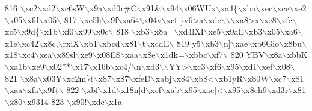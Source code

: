 \begin{DoxyCode}
{{{{{{816 \textcolor{stringliteral}{\(\backslash\)xc2\(\backslash\)xd2\(\backslash\)xc6sW\(\backslash\)x9a\(\backslash\)xd0r#C\(\backslash\)x91&\(\backslash\)x94\(\backslash\)x06WUx\(\backslash\)xa4\{\(\backslash\)xba\(\backslash\)xec\(\backslash\)xce\(\backslash\)xe2\(\backslash\)x05\(\backslash\)xfd\(\backslash\)x05\(\backslash\)}
817 \textcolor{stringliteral}{\(\backslash\)xe5h\(\backslash\)x9f\(\backslash\)xa64\(\backslash\)x04v\(\backslash\)xcf \}v6>a\(\backslash\)xdc\(\backslash\)\(\backslash\)\(\backslash\)xa8>x\(\backslash\)xe8\(\backslash\)xfc\(\backslash\)xc5\(\backslash\)x9d\{\(\backslash\)x1b\(\backslash\)xf0\(\backslash\)x99\(\backslash\)x0c\(\backslash\)}
818 \textcolor{stringliteral}{\(\backslash\)xb3\(\backslash\)x8a=\(\backslash\)xd4lXI\(\backslash\)xe5\(\backslash\)x9aE\(\backslash\)xb3\(\backslash\)x05\(\backslash\)xa6\(\backslash\)x1e\(\backslash\)xc42\(\backslash\)x8c,\(\backslash\)rxiX\(\backslash\)xb1\(\backslash\)xbcd\(\backslash\)x81\(\backslash\)t\(\backslash\)xcdE\(\backslash\)}
819 \textcolor{stringliteral}{y5\(\backslash\)xb3\(\backslash\)n]\(\backslash\)xae\(\backslash\)xb6Gio\(\backslash\)x8bu\(\backslash\)x18\(\backslash\)xc4\(\backslash\)xea\(\backslash\)x89sl\(\backslash\)xe9\(\backslash\)x08ES\(\backslash\)xaa\(\backslash\)x8e\(\backslash\)x1dk=\(\backslash\)xbbc\(\backslash\)xf7\(\backslash\)}
820 \textcolor{stringliteral}{YBV\(\backslash\)x8a\(\backslash\)xbbK\(\backslash\)xa1b\(\backslash\)xe9\(\backslash\)x02**\(\backslash\)x17\(\backslash\)x16b\(\backslash\)xc4/\(\backslash\)n\(\backslash\)xd3\(\backslash\)\(\backslash\)YY>\(\backslash\)xc3\(\backslash\)xf6\(\backslash\)x95\(\backslash\)xd1\(\backslash\)xef\(\backslash\)x08\(\backslash\)}
821 \textcolor{stringliteral}{\(\backslash\)x8a\(\backslash\)x03Y\(\backslash\)xc2m\}t\(\backslash\)x87\(\backslash\)x87\(\backslash\)xfeD\(\backslash\)xabj\(\backslash\)x84\(\backslash\)xb8<\(\backslash\)xb1yR\(\backslash\)x80W\(\backslash\)xc7\(\backslash\)x81\(\backslash\)xaa\(\backslash\)xfa\(\backslash\)x9f\{\(\backslash\)}
822 \textcolor{stringliteral}{\(\backslash\)xbf\(\backslash\)x1d\(\backslash\)x18n|d\(\backslash\)xcf\(\backslash\)xab\(\backslash\)x95\(\backslash\)xac]<\(\backslash\)x95\(\backslash\)x8eh9\(\backslash\)xd3r\(\backslash\)x81\(\backslash\)x80\(\backslash\)x9314%
823 \textcolor{stringliteral}{\(\backslash\)x90!\(\backslash\)xdc\(\backslash\)x1a%
}}}}}}}}
\end{DoxyCode}
